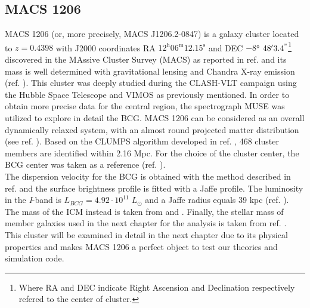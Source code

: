 \subsection{MACS 1206}
MACS 1206 (or, more precisely, MACS J1206.2-0847) is a galaxy cluster located to $z = 0.4398$ with J2000 coordinates RA $12^\text{h} 06^\text{m} 12.15^\text{s}$ and DEC $-8$° $48'3.4^"$\footnote{Where RA and DEC indicate Right Ascension and Declination respectively refered to the center of cluster.} discovered in the MAssive Cluster Survey (MACS) as reported in ref. \cite{Ebeling2009} and its mass is well determined with gravitational lensing and Chandra X-ray emission (ref. \cite{CLASH:_MASS_DISTRIBUTION_IN_AND_AROUND_MACS_J1206.2-0847_FROM_A_FULL_CLUSTER_LENSING_ANALYSIS}). 
This cluster was deeply studied during the CLASH-VLT campaign using the Hubble Space Telescope and VIMOS as previously mentioned. In order to obtain more precise data for the central region, the spectrograph MUSE was utilized to explore in detail the BCG.
MACS 1206 can be considered as an overall dynamically relaxed system, with an almost round projected matter distribution (see ref. \cite{Girardi_et_al._2015}). Based on the CLUMPS algorithm developed in ref. \cite{Biviano_CLUMPS}, 468 cluster members are identified within 2.16 Mpc. For the choice of the cluster center, the BCG center was taken as a reference (ref. \cite{Pizzuti_refracted_gravity_2025}).\\ The dispersion velocity for the BCG is obtained with the method described in ref. \cite{Sartoris_et_al._2020} and the surface  brightness profile is fitted with a Jaffe profile. The luminosity in the \textit{I}-band is $L_{BCG} = 4.92 \cdot 10^{11} \; L_\odot$ and a Jaffe radius equals 39 kpc (ref. \cite{Pizzuti_refracted_gravity_2025}). The mass of the ICM instead is taken from \cite{Ettori_2011} and \cite{CLASH-VLT:-The-Inner-Slope-of-the-MACS-J1206.2-0847-Dark-Matter-Density-Profile}. Finally, the stellar mass of member galaxies used in the next chapter for the analysis is taken from ref. \cite{Annunziatella_2014}.\\
This cluster will be examined in detail in the next chapter due to its physical properties and makes MACS 1206 a perfect object to test our theories and simulation code.

